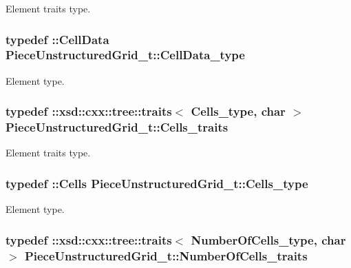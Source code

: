 Element traits type. 

\hypertarget{classPieceUnstructuredGrid__t_a4232a7b88477ee6f692a4e5fab6a65d1}{
\subsubsection[{Cell\-Data\-\_\-type}]{\setlength{\rightskip}{0pt plus 5cm}typedef \-::{\bf Cell\-Data} {\bf Piece\-Unstructured\-Grid\-\_\-t\-::\-Cell\-Data\-\_\-type}}}\label{classPieceUnstructuredGrid__t_a4232a7b88477ee6f692a4e5fab6a65d1}


Element type. 

\hypertarget{classPieceUnstructuredGrid__t_a33252b6f55b5ae830ceecdf9be42cce1}{
\subsubsection[{Cells\-\_\-traits}]{\setlength{\rightskip}{0pt plus 5cm}typedef \-::xsd\-::cxx\-::tree\-::traits$<$ {\bf Cells\-\_\-type}, char $>$ {\bf Piece\-Unstructured\-Grid\-\_\-t\-::\-Cells\-\_\-traits}}}\label{classPieceUnstructuredGrid__t_a33252b6f55b5ae830ceecdf9be42cce1}


Element traits type. 

\hypertarget{classPieceUnstructuredGrid__t_aca1ec38eff08bde0cd115c54dbb7a20f}{
\subsubsection[{Cells\-\_\-type}]{\setlength{\rightskip}{0pt plus 5cm}typedef \-::{\bf Cells} {\bf Piece\-Unstructured\-Grid\-\_\-t\-::\-Cells\-\_\-type}}}\label{classPieceUnstructuredGrid__t_aca1ec38eff08bde0cd115c54dbb7a20f}


Element type. 

\hypertarget{classPieceUnstructuredGrid__t_a7c7607d306bde9e187b9cb3f570d6155}{
\subsubsection[{Number\-Of\-Cells\-\_\-traits}]{\setlength{\rightskip}{0pt plus 5cm}typedef \-::xsd\-::cxx\-::tree\-::traits$<$ {\bf Number\-Of\-Cells\-\_\-type}, char $>$ {\bf Piece\-Unstructured\-Grid\-\_\-t\-::\-Number\-Of\-Cells\-\_\-traits}}}\label{classPieceUnstructuredGrid__t_a7c7607d306bde9e187b9cb3f570d6155}



